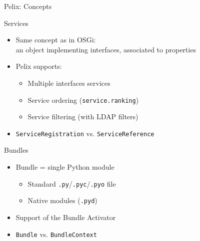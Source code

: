 \begin{frame}{Pelix: Concepts}

\begin{block}{Services}
\begin{itemize}
\item Same concept as in OSGi:\\
an object implementing interfaces, associated to properties
\item Pelix supports:
\begin{itemize}
\item Multiple interfaces services
\item Service ordering (\texttt{service.ranking})
\item Service filtering (with LDAP filters)
\end{itemize}
\item \texttt{ServiceRegistration} vs. \texttt{ServiceReference}
\end{itemize}
\end{block}

\begin{block}{Bundles}
\begin{itemize}
\item Bundle = single Python module
\begin{itemize}
\item Standard \texttt{.py}/\texttt{.pyc}/\texttt{.pyo} file
\item Native modules (\texttt{.pyd})
\end{itemize}
\item Support of the Bundle Activator
\item \texttt{Bundle} vs. \texttt{BundleContext}
\end{itemize}
\end{block}
\end{frame}


